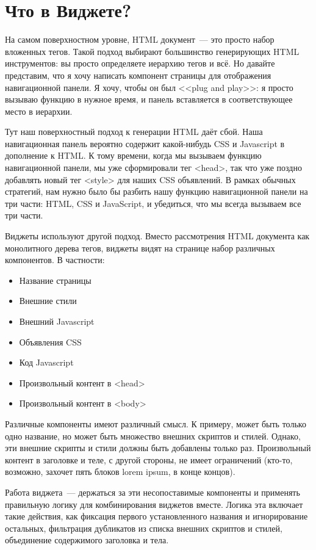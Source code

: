 \section{Что в Виджете?}
На самом поверхностном уровне, HTML документ~--- это просто набор вложенных
тегов. Такой подход выбирают большинство генерирующих HTML инструментов: вы
просто определяете иерархию тегов и всё. Но давайте представим, что я хочу
написать компонент страницы для отображения навигационной панели. Я хочу, чтобы
он был <<plug and play>>: я просто вызываю функцию в нужное время, и панель
вставляется в соответствующее место в иерархии.

Тут наш поверхностный подход к генерации HTML даёт сбой. Наша навигационная
панель вероятно содержит какой-нибудь CSS и Javascript в дополнение к HTML. К
тому времени, когда мы вызываем функцию навигационной панели, мы уже
сформировали тег <head>, так что уже поздно добавлять новый тег <style> для
наших CSS объявлений. В рамках обычных стратегий, нам нужно было бы разбить
нашу функцию навигационной панели на три части: HTML, CSS и JavaScript, и
убедиться, что мы всегда вызываем все три части.

Виджеты используют другой подход. Вместо рассмотрения HTML документа как
монолитного дерева тегов, виджеты видят на странице набор различных
компонентов. В частности:
\begin{itemize}
    \item Название страницы
    \item Внешние стили
    \item Внешний Javascript
    \item Объявления CSS
    \item Код Javascript
    \item Произвольный контент в <head>
    \item Произвольный контент в <body>
\end{itemize}

Различные компоненты имеют различный смысл. К примеру, может быть только одно
название, но может быть множество внешних скриптов и стилей. Однако, эти
внешние скрипты и стили должны быть добавлены только раз. Произвольный контент
в заголовке и теле, с другой стороны, не имеет ограничений (кто-то, возможно,
захочет пять блоков lorem ipsum, в конце концов).

Работа виджета~--- держаться за эти несопоставимые компоненты и применять
правильную логику для комбинирования виджетов вместе. Логика эта включает такие
действия, как фиксация первого установленного названия и игнорирование
остальных, фильтрация дубликатов из списка внешних скриптов и стилей,
объединение содержимого заголовка и тела.

